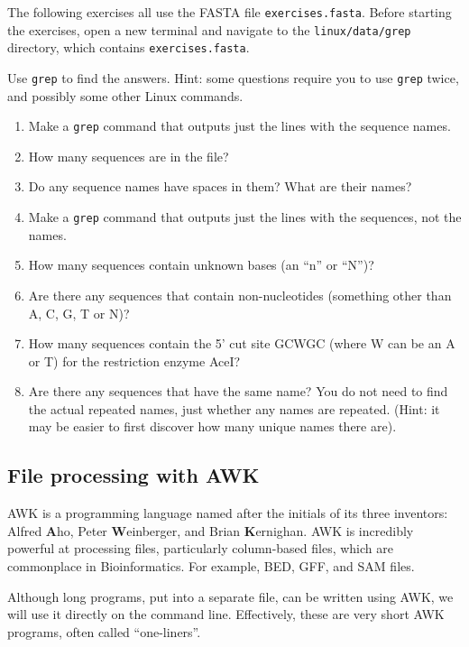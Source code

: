 \documentclass[11pt]{article}
\providecommand{\tightlist}{%
      \setlength{\itemsep}{0pt}\setlength{\parskip}{0pt}}
\begin{document}
The following exercises all use the FASTA file \texttt{exercises.fasta}.
Before starting the exercises, open a new terminal and navigate to the
\texttt{linux/data/grep} directory, which contains
\texttt{exercises.fasta}.

Use \texttt{grep} to find the answers. Hint: some questions require you
to use \texttt{grep} twice, and possibly some other Linux commands.

\begin{enumerate}
\def\labelenumi{\arabic{enumi}.}
\tightlist
\item
  Make a \texttt{grep} command that outputs just the lines with the
  sequence names.
\item
  How many sequences are in the file?
\item
  Do any sequence names have spaces in them? What are their names?
\item
  Make a \texttt{grep} command that outputs just the lines with the
  sequences, not the names.
\item
  How many sequences contain unknown bases (an ``n'' or ``N'')?
\item
  Are there any sequences that contain non-nucleotides (something other
  than A, C, G, T or N)?
\item
  How many sequences contain the 5' cut site GCWGC (where W can be an A
  or T) for the restriction enzyme AceI?
\item
  Are there any sequences that have the same name? You do not need to
  find the actual repeated names, just whether any names are repeated.
  (Hint: it may be easier to first discover how many unique names there
  are).
\end{enumerate}

    \hypertarget{file-processing-with-awk}{%
\subsection{File processing with AWK}\label{file-processing-with-awk}}

AWK is a programming language named after the initials of its three
inventors: Alfred \textbf{A}ho, Peter \textbf{W}einberger, and Brian
\textbf{K}ernighan. AWK is incredibly powerful at processing files,
particularly column-based files, which are commonplace in
Bioinformatics. For example, BED, GFF, and SAM files.

Although long programs, put into a separate file, can be written using
AWK, we will use it directly on the command line. Effectively, these are
very short AWK programs, often called ``one-liners''.
\end{document}
